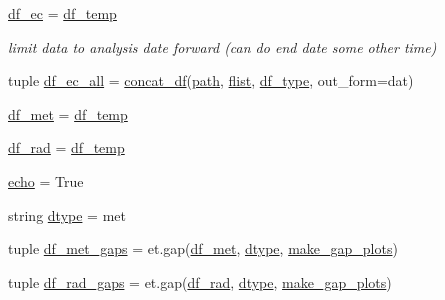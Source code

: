 \begin{DoxyCompactItemize}
\hyperlink{namespace_date___ranges___concat__script_a6b75ca8020ee28148a9e0c6d2772773f}{df\+\_\+ec} = \hyperlink{namespace_date___ranges___concat__script_ac8906280d8951e2a35e0bfab0023e8ff}{df\+\_\+temp}
\begin{DoxyCompactList}\small\item\em limit data to analysis date forward (can do end date some other time) \end{DoxyCompactList}\item 
tuple \hyperlink{namespace_date___ranges___concat__script_ad91435fa2329924f81af6219f338116d}{df\+\_\+ec\+\_\+all} = \hyperlink{namespace_date___ranges___concat__script_ad955506c0e46fb40847aab5fd1059336}{concat\+\_\+df}(\hyperlink{namespace_date___ranges___concat__script_a8333f861dcf7a2c4d8513c76222f5c6a}{path}, \hyperlink{namespace_date___ranges___concat__script_a85f8f04b5018cab654cd0912d726418c}{flist}, \hyperlink{namespace_date___ranges___concat__script_ac33a88b539edf5ce073799879c45e2e8}{df\+\_\+type}, out\+\_\+form=\textquotesingle{}dat\textquotesingle{})
\item 
\hyperlink{namespace_date___ranges___concat__script_a5e14622a073742013d9fbfb848d5bacc}{df\+\_\+met} = \hyperlink{namespace_date___ranges___concat__script_ac8906280d8951e2a35e0bfab0023e8ff}{df\+\_\+temp}
\item 
\hyperlink{namespace_date___ranges___concat__script_a9631d14137c13d0357d9b25cb16274e9}{df\+\_\+rad} = \hyperlink{namespace_date___ranges___concat__script_ac8906280d8951e2a35e0bfab0023e8ff}{df\+\_\+temp}
\item 
\hyperlink{namespace_date___ranges___concat__script_a7e6380a9309908f90f8b0f73039f0798}{echo} = True
\item 
string \hyperlink{namespace_date___ranges___concat__script_a56177341fd21f8aeccbe4aec16af04a6}{dtype} = \textquotesingle{}met\textquotesingle{}
\item 
tuple \hyperlink{namespace_date___ranges___concat__script_a84d25a038de8829ab65c634c27663453}{df\+\_\+met\+\_\+gaps} = et.\+gap(\hyperlink{namespace_date___ranges___concat__script_a5e14622a073742013d9fbfb848d5bacc}{df\+\_\+met}, \hyperlink{namespace_date___ranges___concat__script_a56177341fd21f8aeccbe4aec16af04a6}{dtype}, \hyperlink{namespace_date___ranges___concat__script_a8daa59e883d598cddf6265daf73b3368}{make\+\_\+gap\+\_\+plots})
\item 
tuple \hyperlink{namespace_date___ranges___concat__script_a51d248766e4b3ed7f69e33a65a3e3e16}{df\+\_\+rad\+\_\+gaps} = et.\+gap(\hyperlink{namespace_date___ranges___concat__script_a9631d14137c13d0357d9b25cb16274e9}{df\+\_\+rad}, \hyperlink{namespace_date___ranges___concat__script_a56177341fd21f8aeccbe4aec16af04a6}{dtype}, \hyperlink{namespace_date___ranges___concat__script_a8daa59e883d598cddf6265daf73b3368}{make\+\_\+gap\+\_\+plots})

\end{DoxyCompactItemize}

